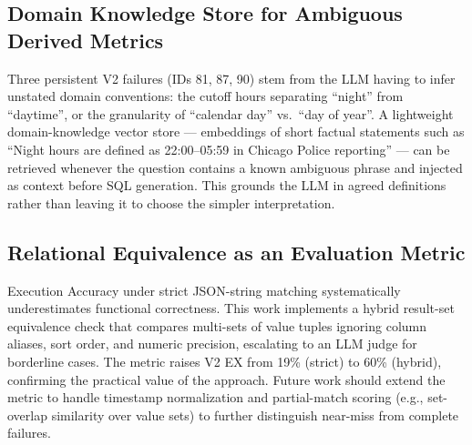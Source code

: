 \subsection{Domain Knowledge Store for Ambiguous Derived Metrics}

Three persistent V2 failures (IDs 81, 87, 90) stem from the LLM having to infer
unstated domain conventions: the cutoff hours separating ``night'' from
``daytime'', or the granularity of ``calendar day'' vs.\ ``day of year''.  A
lightweight domain-knowledge vector store — embeddings of short factual
statements such as ``Night hours are defined as 22:00–05:59 in Chicago Police
reporting'' — can be retrieved whenever the question contains a known ambiguous
phrase and injected as context before SQL generation.  This grounds the LLM in
agreed definitions rather than leaving it to choose the simpler interpretation.

\subsection{Relational Equivalence as an Evaluation Metric}

Execution Accuracy under strict JSON-string matching systematically
underestimates functional correctness.  This work implements a hybrid
result-set equivalence check that compares multi-sets of value tuples ignoring
column aliases, sort order, and numeric precision, escalating to an LLM judge
for borderline cases.  The metric raises V2 EX from 19\% (strict) to 60\%
(hybrid), confirming the practical value of the approach.  Future work should
extend the metric to handle timestamp normalization and partial-match scoring
(e.g., set-overlap similarity over value sets) to further distinguish near-miss
from complete failures.


